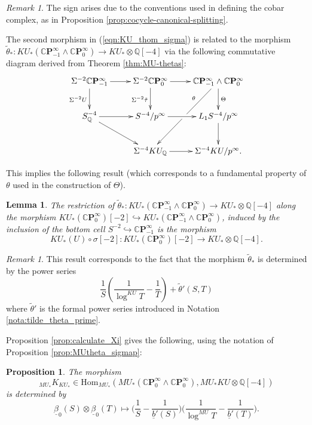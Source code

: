 \documentclass[10pt,a4paper]{amsart}
\newtheorem{prop}[thm]{Proposition}
\newtheorem{lem}[thm]{Lemma}
\theoremstyle{definition}
\theoremstyle{remark}
\newtheorem{rem}[thm]{Remark}
\renewcommand{\hom}{\mathrm{Hom}}
\newcommand{\rat}{\mathbb{Q}}
\newcommand{\cp}{\mathbb{C} \mathbf{P}^\infty}
\renewcommand{\smash}{\wedge}
\begin{document}
\begin{rem}
The sign arises due to the conventions used in defining the cobar complex, as in Proposition \ref{prop:cocycle-canonical-splitting}.
\end{rem}

The second  morphism in (\ref{eqn:KU_thom_sigma}) is related to the morphism $\tilde{\theta}_* : KU_* (\cp_{-1} \smash \cp_0) \rightarrow KU_* \otimes
\rat [-4]$ via the following commutative diagram derived from Theorem \ref{thm:MU-thetas}:
\[
 \xymatrix{
\Sigma^{-2} \cp_{-1}
\ar[r]
\ar[d]_{\Sigma^{-2}U}
&
\Sigma^{-2} \cp_0
\ar[d]_{\Sigma^{-2}\tilde{\tau}}
\ar[r]
&
\cp_{-1}
\smash
\cp_0
\ar[d]^{\Theta}
\ar[ldd]|\hole_(.3)\theta
\\
S^{-4}_\rat
\ar[r]
\ar[rd]
&
S^{-4}/p^\infty
\ar[r]
&
L_1 S^{-4} /p^\infty
\ar[d]
\\
&
\Sigma^{-4} KU_\rat
\ar[r]
&
\Sigma^{-4} KU/p^\infty.
}
\]

This implies the following result (which corresponds to a fundamental property of $\theta$ used in the construction of $\Theta$).

\begin{lem}
\label{lem:restrict_Theta}
The restriction of $\tilde{\theta}_* : KU_* (\cp_{-1} \smash \cp_0) \rightarrow
KU_* \otimes \rat[-4]$ along the morphism $KU_* (\cp_0) [-2] \hookrightarrow KU_* (\cp_{-1} \smash \cp_0)$, induced by
the inclusion of the bottom cell $S^{-2} \hookrightarrow \cp_{-1}$ is
 the morphism
 \[
 KU_*(U) \circ \sigma[-2] : 	KU_* (\cp_0) [-2]
\rightarrow KU_* \otimes \rat [-4].
 \]
\end{lem}

\begin{rem}
This result corresponds to the fact that the morphism $\tilde{\theta}_*$ is determined by the  power series
	\[
		\frac{1}{S} \left(\frac{1}{\log^{KU}T} - \frac{1}{T}\right)
+
\tilde{\theta} ' (S,T)
	\]
where $\tilde{\theta}'$ is the formal power series introduced in Notation \ref{nota:tilde_theta_prime}.
\end{rem}

Proposition \ref{prop:calculate_Xi} gives the following, using the notation of Proposition \ref{prop:MUtheta_sigmap}:

\begin{prop}
 \label{prop:calculate_K_KU}
The morphism $$_{MU_*}K_{KU_*} \in \hom_{MU_*} (MU_* (\cp_0\smash \cp_0), MU_*KU \otimes
\rat [-4])$$ is determined by
\[
 \underline{\beta}_0 (S) \otimes \underline{\beta}_0 (T)
\mapsto
\Big(
\frac{1}{S}- \frac{1}{\underline{b}'(S)}
\Big)
\Big(
\frac{1}{\log^{MU} T }
- \frac{1}{\underline{b}'(T)}
\Big).
\]
\end{prop}
\end{document}
